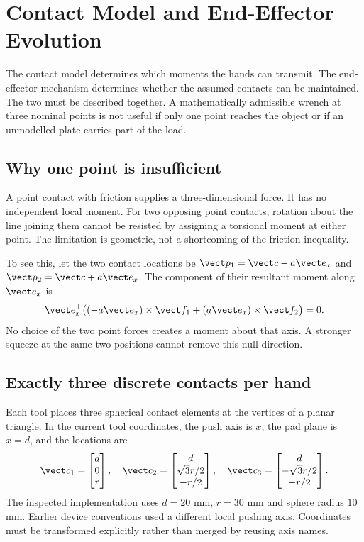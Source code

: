 \chapter{Contact Model and End-Effector Evolution}
\label{ch:contacts}

The contact model determines which moments the hands can transmit. The end-effector mechanism determines whether the assumed contacts can be maintained. The two must be described together. A mathematically admissible wrench at three nominal points is not useful if only one point reaches the object or if an unmodelled plate carries part of the load.

\section{Why one point is insufficient}

A point contact with friction supplies a three-dimensional force. It has no independent local moment. For two opposing point contacts, rotation about the line joining them cannot be resisted by assigning a torsional moment at either point. The limitation is geometric, not a shortcoming of the friction inequality.

To see this, let the two contact locations be $\vect p_1=\vect c-a\vect e_x$ and $\vect p_2=\vect c+a\vect e_x$. The component of their resultant moment along $\vect e_x$ is
\begin{equation}
\vect e_x^\top\bigl((-a\vect e_x)\times\vect f_1
+(a\vect e_x)\times\vect f_2\bigr)=0.
\end{equation}
No choice of the two point forces creates a moment about that axis. A stronger squeeze at the same two positions cannot remove this null direction.

\section{Exactly three discrete contacts per hand}

Each tool places three spherical contact elements at the vertices of a planar triangle. In the current tool coordinates, the push axis is $x$, the pad plane is $x=d$, and the locations are
\begin{equation}
\vect c_1=\begin{bmatrix}d\\0\\r\end{bmatrix},\quad
\vect c_2=\begin{bmatrix}d\\\sqrt{3}r/2\\-r/2\end{bmatrix},\quad
\vect c_3=\begin{bmatrix}d\\-\sqrt{3}r/2\\-r/2\end{bmatrix}.
\label{eq:pad-geometry}
\end{equation}
The inspected implementation uses $d=20$ mm, $r=30$ mm and sphere radius $10$ mm. Earlier device conventions used a different local pushing axis. Coordinates must be transformed explicitly rather than merged by reusing axis names.

